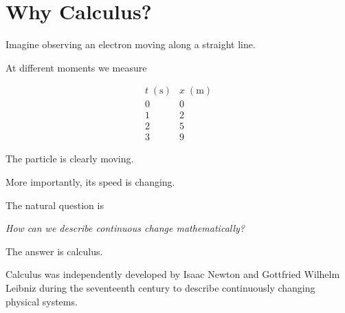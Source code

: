 \section{Why Calculus?}

Imagine observing an electron moving along a straight line.

At different moments we measure

\[
\begin{array}{c|c}
	t\;(\mathrm{s}) & x\;(\mathrm{m})\\
	\hline
	0 & 0\\
	1 & 2\\
	2 & 5\\
	3 & 9
\end{array}
\]

The particle is clearly moving.

More importantly, its speed is changing.

The natural question is

\begin{center}
	\emph{How can we describe continuous change mathematically?}
\end{center}

The answer is calculus.

Calculus was independently developed by Isaac Newton and Gottfried Wilhelm
Leibniz during the seventeenth century to describe continuously changing
physical systems.

